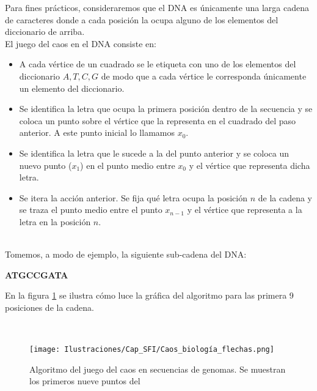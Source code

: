 \documentclass[letterpaper,12pt,oneside]{book}
\begin{document}
Para fines prácticos, consideraremos que el DNA es únicamente una larga cadena de caracteres donde a cada posición la ocupa alguno de los elementos del diccionario de arriba.
\\

El juego del caos en el DNA consiste en:

\begin{itemize}
\item A cada vértice de un cuadrado se le etiqueta con uno de los elementos del diccionario ${A, T, C, G}$ de modo que a cada vértice le corresponda únicamente un elemento del diccionario.
\item Se identifica la letra que ocupa la primera posición dentro de la secuencia y se coloca un punto sobre el vértice que la representa en el cuadrado del paso anterior. A este punto inicial lo llamamos $x_{0}$.
\item Se identifica la letra que le sucede a la del punto anterior y se coloca un nuevo punto ($x_{1}$) en el punto medio entre $x_{0}$ y el vértice que representa dicha letra. 
\item Se itera la acción anterior. Se fija qué letra ocupa la posición $n$ de la cadena y se traza el punto medio entre el punto $x_{n-1}$ y el vértice que representa a la letra en la posición $n$.
\end{itemize}
\\

Tomemos, a modo de ejemplo, la siguiente sub-cadena del DNA:

\begin{center}
\textbf{ATGCCGATA}
\end{center}

En la figura \ref{fig:DNA_chaos_game} se ilustra cómo luce la gráfica del algoritmo para las primera 9 posiciones de la cadena.

\\



\begin{figure}[h!]
    \centering
    \texttt{[image: Ilustraciones/Cap\_SFI/Caos\_biología\_flechas.png]}
    \caption{Algoritmo del juego del caos en secuencias de genomas. Se muestran los primeros nueve puntos del}
    \label{fig:DNA_chaos_game}
\end{figure}
\end{document}
